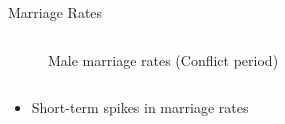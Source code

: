 \documentclass{beamer}
\begin{document}
\begin{frame}{Marriage Rates}
\begin{columns}
				\begin{column}{0.5\paperwidth}
					\begin{figure}
						\caption{Male marriage rates (Conflict period)}
					\end{figure}
				\end{column}
			\end{columns}	

			\begin{itemize}
				\item Short-term spikes in marriage rates
			\end{itemize}
		\end{frame}
\end{document}
